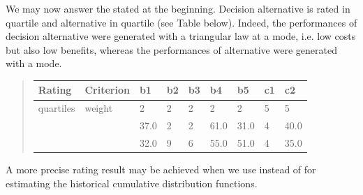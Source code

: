 \documentclass[a4paper,12pt,english]{sphinxhowto}
\begin{document}
We may now answer the  stated at the beginning. Decision alternative  is rated in quartile  and alternative  in quartile  (see Table below). Indeed, the performances of decision alternative  were generated with a triangular law at a  mode, i.e. low costs but also low benefits, whereas the performances of alternative  were generated with a  mode.
\begin{quote}


\begin{savenotes}\sphinxattablestart
\centering
\begin{tabulary}{\linewidth}[t]{|T|T|T|T|T|T|T|T|T|}
\hline
\sphinxstyletheadfamily 
Rating
&\sphinxstyletheadfamily 
Criterion
&\sphinxstyletheadfamily 
b1
&\sphinxstyletheadfamily 
b2
&\sphinxstyletheadfamily 
b3
&\sphinxstyletheadfamily 
b4
&\sphinxstyletheadfamily 
b5
&\sphinxstyletheadfamily 
c1
&\sphinxstyletheadfamily 
c2
\\
\hline
quartiles
&
weight
&
2
&
2
&
2
&
2
&
2
&
5
&
5
\\
\hline
{}
&
&
37.0
&
2
&
2
&
61.0
&
31.0
&
\sphinxhyphen{}4
&
\sphinxhyphen{}40.0
\\
\hline
{}
&
&
32.0
&
9
&
6
&
55.0
&
51.0
&
\sphinxhyphen{}4
&
\sphinxhyphen{}35.0
\\
\hline
\end{tabulary}
\par
\sphinxattableend\end{savenotes}
\end{quote}

A more precise rating result may be achieved when we use  instead of  for estimating the historical cumulative distribution functions.
\end{document}

